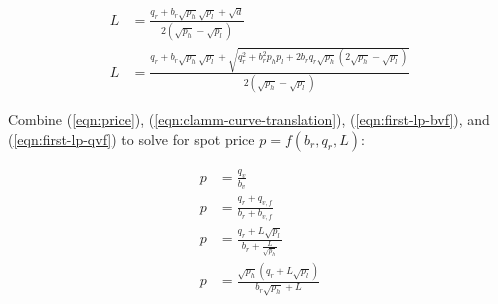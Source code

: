 \documentclass[table, twocolumn]{article}
\begin{document}
\begin{align} \label{eqn:first-lp-quadratic-4}
  L & = \frac{q_r + b_r \sqrt{p_h} \sqrt{p_l} + \sqrt{d}}
  {2(\sqrt{p_h} - \sqrt{p_l})} \nonumber                  \\
  L & = \frac{q_r + b_r \sqrt{p_h} \sqrt{p_l} + \sqrt{
      q_r^2 + b_r^2 p_h p_l + 2 b_r q_r \sqrt{p_h} (2 \sqrt{p_h} - \sqrt{p_l})
    }} {2(\sqrt{p_h} - \sqrt{p_l})}
\end{align}

Combine (\ref{eqn:price}), (\ref{eqn:clamm-curve-translation}),
(\ref{eqn:first-lp-bvf}), and (\ref{eqn:first-lp-qvf}) to solve for spot price
$p = f(b_r, q_r, L)$:

\begin{align} \label{eqn:first-lp-spot-price}
  p & = \frac{q_v}{b_v} \nonumber                                       \\
  p & = \frac{q_r + q_{v, f}}{b_r + b_{v, f}} \nonumber                 \\
  p & = \frac{q_r + L \sqrt{p_l}}{b_r + \frac{L}{\sqrt{p_h}}} \nonumber \\
  p & = \frac{\sqrt{p_h}(q_r + L \sqrt{p_l})}{b_r \sqrt{p_h} + L}
\end{align}
\end{document}
